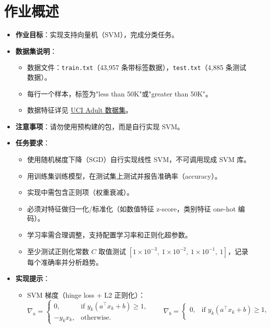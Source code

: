 \documentclass[a4paper]{article}
\begin{document}
\section{作业概述}
{
\begin{itemize}
    \item \textbf{作业目标}：实现支持向量机（SVM），完成分类任务。
    \item \textbf{数据集说明}：
    \begin{itemize}
        \item 数据文件：\texttt{train.txt}（43,957 条带标签数据），\texttt{test.txt}（4,885 条测试数据）。
        \item 每行一个样本，标签为"less than 50K"或"greater than 50K"。
        \item 数据特征详见 \href{https://archive.ics.uci.edu/ml/datasets/Adult}{UCI Adult 数据集}。
    \end{itemize}
    \item \textbf{注意事项}：请勿使用预构建的包，而是自行实现 SVM。
    \item \textbf{任务要求}：
    \begin{itemize}
        \item 使用随机梯度下降（SGD）自行实现线性 SVM，不可调用现成 SVM 库。
        \item 用训练集训练模型，在测试集上测试并报告准确率（accuracy）。
        \item 实现中需包含正则项（权重衰减）。
        \item 必须对特征做归一化/标准化（如数值特征 z-score，类别特征 one-hot 编码）。
        \item 学习率需合理调整，支持配置学习率和正则化超参数。
        \item 至少测试正则化常数 $C$ 取值测试 $\left[1\times10^{-3},\ 1\times10^{-2},\ 1\times10^{-1},\ 1\right]$，记录每个准确率并分析趋势。
    \end{itemize}
    \item \textbf{实现提示}：
    \begin{itemize}
        \item SVM 梯度（hinge loss + L2 正则化）：
        \[
        \nabla_a = 
        \begin{cases}
        0, & \text{if } y_k(a^\top x_k + b) \ge 1,\\
        - y_k x_k, & \text{otherwise.}
        \end{cases}
        \qquad
        \nabla_b =
        \begin{cases}
        0, & \text{if } y_k(a^\top x_k + b) \ge 1,\\

\end{cases}\]
\end{itemize}
\end{itemize}}
\end{document}
